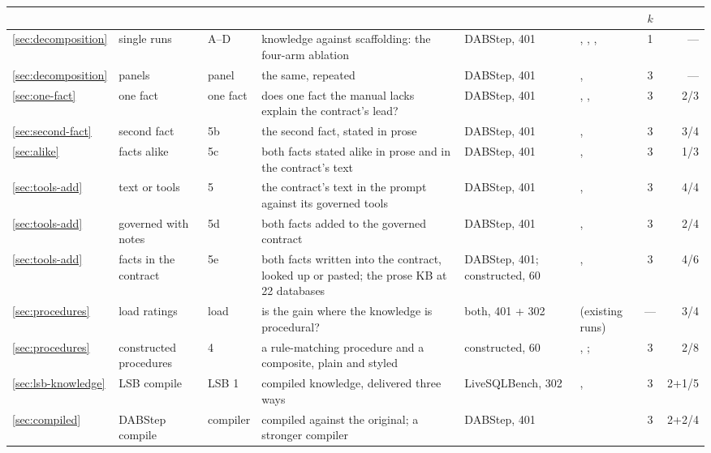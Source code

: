 \begin{table}[t]
\centering
\scriptsize
\setlength{\tabcolsep}{3pt}
\begin{tabular}{@{}lllL{5.5cm}lL{3.0cm}cr@{}}
\toprule
\tabhead{\S} &  &  &  &  &  & $k$ &  \\
\midrule
\ref{sec:decomposition} & single runs & A--D & knowledge against scaffolding: the four-arm ablation & DABStep, 401 & \mGLM{}, \mDS{}, \mSON{}, \mGPT{} & 1 & --- \\
\ref{sec:decomposition} & panels & panel & the same, repeated & DABStep, 401 & \mSol{}, \mQwen{} & 3 & --- \\
\midrule
\ref{sec:one-fact} & one fact & one fact & does one fact the manual lacks explain the contract's lead? & DABStep, 401 & \mSol{}, \mQwen{}, \mLuna{} & 3 & 2/3 \\
\ref{sec:second-fact} & second fact & 5b & the second fact, stated in prose & DABStep, 401 & \mLuna{}, \mQwen{} & 3 & 3/4 \\
\ref{sec:alike} & facts alike & 5c & both facts stated alike in prose and in the contract's text & DABStep, 401 & \mLuna{}, \mQwen{} & 3 & 1/3 \\
\ref{sec:tools-add} & text or tools & 5 & the contract's text in the prompt against its governed tools & DABStep, 401 & \mLuna{}, \mQwen{} & 3 & 4/4 \\
\ref{sec:tools-add} & governed with notes & 5d & both facts added to the governed contract & DABStep, 401 & \mLuna{}, \mQwen{} & 3 & 2/4 \\
\ref{sec:tools-add} & facts in the contract & 5e & both facts written into the contract, looked up or pasted; the prose KB at 22 databases & DABStep, 401; constructed, 60 & \mLuna{}, \mQwen{} & 3 & 4/6 \\
\ref{sec:procedures} & load ratings & load & is the gain where the knowledge is procedural? & both, 401 + 302 & (existing runs) & --- & 3/4 \\
\ref{sec:procedures} & constructed procedures & 4 & a rule-matching procedure and a composite, plain and styled & constructed, 60 & \mLuna{}, \mSol{}; \mQwen{} & 3 & 2/8 \\
\midrule
\ref{sec:lsb-knowledge} & LSB compile & LSB 1 & compiled knowledge, delivered three ways & LiveSQLBench, 302 & \mLuna{}, \mQwen{} & 3 & 2+1/5 \\
\ref{sec:compiled} & DABStep compile & compiler & compiled against the original; a stronger compiler & DABStep, 401 & \mLuna{} & 3 & 2+2/4 \\

\end{tabular}
\end{table}
